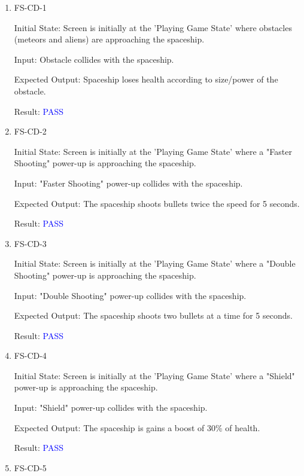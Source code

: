 \documentclass[12pt, titlepage]{article}
\begin{document}
\begin{enumerate}

\item{FS-CD-1\\}
					
Initial State: Screen is initially at the 'Playing Game State' where obstacles (meteors and aliens) are approaching the spaceship.
					
Input: Obstacle collides with the spaceship.  
					
Expected Output: Spaceship loses health according to size/power of the obstacle. 
					
Result: \textcolor{blue}{PASS} 
			
\item{FS-CD-2\\}
					
Initial State: Screen is initially at the 'Playing Game State' where a "Faster Shooting" power-up is approaching the spaceship.
					
Input: "Faster Shooting" power-up collides with the spaceship.  
					
Expected Output: The spaceship shoots bullets twice the speed for 5 seconds.
					
Result: \textcolor{blue}{PASS} 

\item{FS-CD-3\\}
					
Initial State: Screen is initially at the 'Playing Game State' where a "Double Shooting" power-up is approaching the spaceship.
					
Input: "Double Shooting" power-up collides with the spaceship.  
					
Expected Output: The spaceship shoots two bullets at a time for 5 seconds.
					
Result: \textcolor{blue}{PASS} 

\item{FS-CD-4\\}
					
Initial State: Screen is initially at the 'Playing Game State' where a "Shield" power-up is approaching the spaceship.
					
Input: "Shield" power-up collides with the spaceship.  
					
Expected Output: The spaceship is gains a boost of 30\% of health.
					
Result: \textcolor{blue}{PASS} 

\item{FS-CD-5\\}
					

\end{enumerate}
\end{document}
